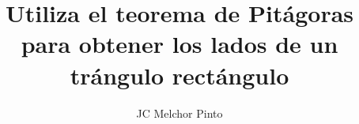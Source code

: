 \documentclass[12pt,addpoints]{guia}
\title{Utiliza el teorema de Pitágoras para obtener los lados de un trángulo rectángulo}
\author{JC Melchor Pinto}
\begin{document}
\INFO%
\begin{multicols}{2}
    
    
    
\end{multicols}
\ejemplosboxed[]
\begin{questions}
    \questionboxed[10] {}
    \questionboxed[10] {}
    \ejemplosboxed[]
    \questionboxed[10] {}
    \questionboxed[10] {}
    \ejemplosboxed[]
    \questionboxed[10] {}
    \questionboxed[10] {}
    \questionboxed[10] {}
    \ejemplosboxed[]
    \questionboxed[10] {}
    \ejemplosboxed[]
    \questionboxed[10] {}  %
    \ejemplosboxed[]
    \questionboxed[10] {}
\end{questions}
\end{document}
